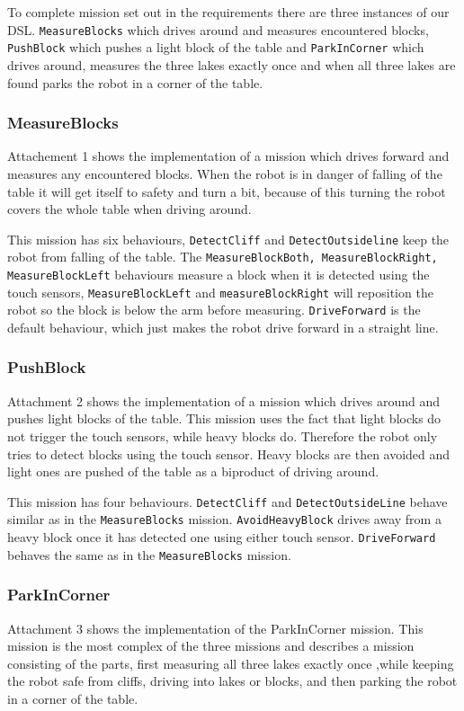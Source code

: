 To complete mission set out in the requirements there are three instances
of our DSL. \texttt{MeasureBlocks} which drives around and measures encountered
blocks, \texttt{PushBlock} which pushes a light block of the table and 
\texttt{ParkInCorner} which drives around, measures the three lakes exactly once
and when all three lakes are found parks the robot in a corner of the table.

\subsubsection{MeasureBlocks}
Attachement 1 shows the implementation of a mission which drives forward and 
measures any encountered blocks. When the robot is in danger of falling of the 
table it will get itself to safety and turn a bit, because of this turning the
robot covers the whole table when driving around.

This mission has six behaviours, \texttt{DetectCliff} and
\texttt{DetectOutsideline} keep the robot from falling of the table. The 
\texttt{MeasureBlockBoth, MeasureBlockRight, MeasureBlockLeft} behaviours 
measure a block when it is detected using the touch sensors, 
\texttt{MeasureBlockLeft} and \texttt{measureBlockRight} will reposition the 
robot so the block is below the arm before measuring. \texttt{DriveForward} is 
the default behaviour, which just makes the robot drive forward in a straight 
line.

\subsubsection{PushBlock}
Attachment 2 shows the implementation of a mission which drives around and 
pushes light blocks of the table. This mission uses the fact that light blocks
do not trigger the touch sensors, while heavy blocks do. Therefore the robot
only tries to detect blocks using the touch sensor. Heavy blocks are then 
avoided and light ones are pushed of the table as a biproduct of driving around.

This mission has four behaviours. \texttt{DetectCliff} and 
\texttt{DetectOutsideLine} behave similar as in the \texttt{MeasureBlocks} 
mission. \texttt{AvoidHeavyBlock} drives away from a heavy block once it has 
detected one using either touch sensor. \texttt{DriveForward} behaves the same
as in the \texttt{MeasureBlocks} mission.

\subsubsection{ParkInCorner}
Attachment 3 shows the implementation of the ParkInCorner mission.
This mission is the most complex of the three missions and describes a 
mission consisting of the parts, first measuring all three lakes exactly once
,while keeping the robot safe from cliffs, driving into lakes or blocks, and 
then parking the robot in a corner of the table. 

